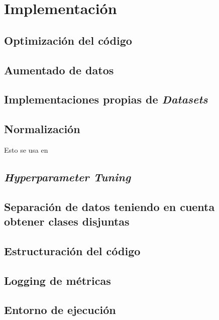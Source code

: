 \chapter{Implementación} \label{ich:implementacion}

\section{Optimización del código} \label{isec:optimizacion_codigo}

\section{Aumentado de datos} \label{isec:aumentado_datos}

\section{Implementaciones propias de \textit{Datasets}} \label{isec:datasets_customs}

\section{Normalización}

Esto se usa en \cite{informatica:facenet}

\section{\textit{Hyperparameter Tuning}} \label{isec:hp_tuning}

\section{Separación de datos teniendo en cuenta obtener clases disjuntas}

\section{Estructuración del código}

\section{Logging de métricas} \label{isec:loggin_metricas}

\section{Entorno de ejecución}

